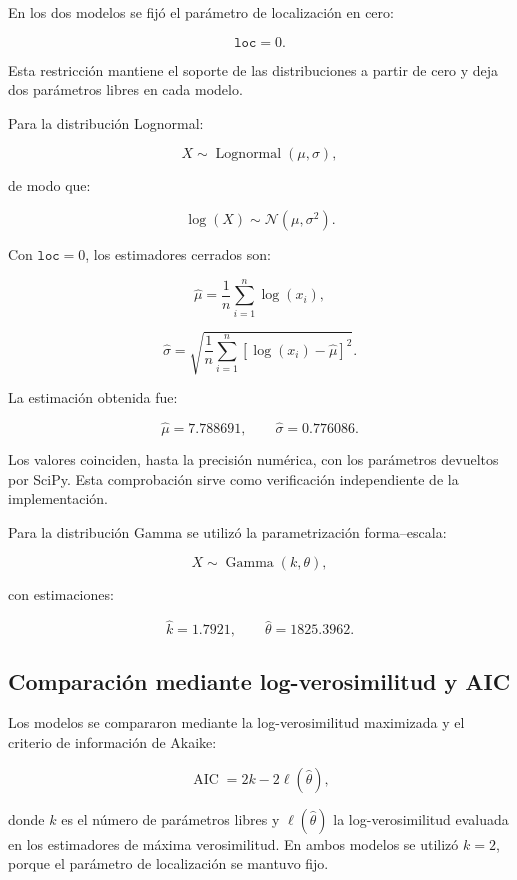 En los dos modelos se fijó el parámetro de localización en cero:

\[
\texttt{loc}=0.
\]

Esta restricción mantiene el soporte de las distribuciones a partir de
cero y deja dos parámetros libres en cada modelo.

Para la distribución Lognormal:

\[
X \sim \operatorname{Lognormal}(\mu,\sigma),
\]

de modo que:

\[
\log(X)\sim\mathcal{N}(\mu,\sigma^2).
\]

Con \(\texttt{loc}=0\), los estimadores cerrados son:

\[
\widehat{\mu}
=
\frac{1}{n}
\sum_{i=1}^{n}\log(x_i),
\]

\[
\widehat{\sigma}
=
\sqrt{
    \frac{1}{n}
    \sum_{i=1}^{n}
    \left[
        \log(x_i)-\widehat{\mu}
    \right]^2
}.
\]

La estimación obtenida fue:

\[
\widehat{\mu}=\num{7.788691},
\qquad
\widehat{\sigma}=\num{0.776086}.
\]

Los valores coinciden, hasta la precisión numérica, con los parámetros
devueltos por SciPy. Esta comprobación sirve como verificación
independiente de la implementación.

Para la distribución Gamma se utilizó la parametrización forma--escala:

\[
X\sim\operatorname{Gamma}(k,\theta),
\]

con estimaciones:

\[
\widehat{k}=\num{1.7921},
\qquad
\widehat{\theta}=\num{1825.3962}.
\]

\subsection{Comparación mediante log-verosimilitud y AIC}

Los modelos se compararon mediante la log-verosimilitud maximizada y el
criterio de información de Akaike:

\[
\operatorname{AIC}
=
2k-2\ell(\widehat{\theta}),
\]

donde \(k\) es el número de parámetros libres y
\(\ell(\widehat{\theta})\) la log-verosimilitud evaluada en los
estimadores de máxima verosimilitud. En ambos modelos se utilizó
\(k=2\), porque el parámetro de localización se mantuvo fijo.

